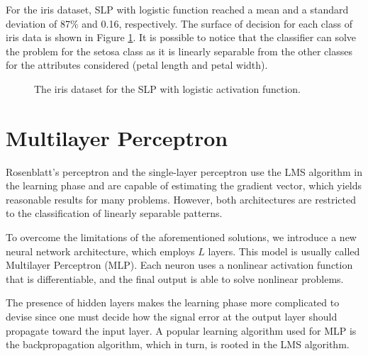 \documentclass[12pt,a4paper]{article}
\begin{document}
For the iris dataset, SLP with logistic function reached a mean and a standard deviation of 87\% and 0.16, respectively.  The surface of decision for each class of iris data is shown in Figure \ref{fig:iris-decision-surface}. It is possible to notice that the classifier can solve the problem for the setosa class as it is linearly separable from the other classes for the attributes considered (petal length and petal width).

\begin{figure}[H]
    \centering
    

    
    \caption{The iris dataset for the SLP with logistic activation function.}
    \label{fig:iris-decision-surface}
    
\end{figure}

\section{Multilayer Perceptron}

Rosenblatt's perceptron and the single-layer perceptron use the LMS algorithm in the learning phase and are capable of estimating the gradient vector, which yields reasonable results for many problems. However, both architectures are restricted to the classification of linearly separable patterns.

To overcome the limitations of the aforementioned solutions, we introduce a new neural network architecture, which employs \(L\) layers. This model is usually called Multilayer Perceptron (MLP). Each neuron uses a nonlinear activation function that is differentiable, and the final output is able to solve nonlinear problems.

The presence of hidden layers makes the learning phase more complicated to devise since one must decide how the signal error at the output layer should propagate toward the input layer. A popular learning algorithm used for MLP is the backpropagation algorithm, which in turn, is rooted in the LMS algorithm.
\end{document}
